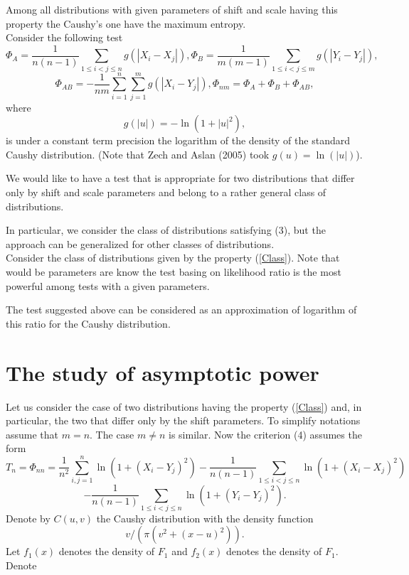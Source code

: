 \documentclass[final,11pt,3p]{elsarticle}
\begin{document}
Among all distributions with given parameters of shift and scale having this property the Caushy's one have the maximum entropy.\\


Consider the following test
\begin{equation}
 \Phi_{A}=\frac{1}{n(n-1)}\sum_{1\leq i<j\leq n} g(|X_i-X_j|),
\Phi_{B}=\frac{1}{m(m-1)}\sum_{1\leq i<j\leq m} g(|Y_i-Y_j|),
\end{equation}
\begin{equation}\label{K1}
\Phi_{AB}=-\frac{1}{nm}\sum_{i=1}^n\sum_{j=1}^m g(|X_i-Y_j|),
\Phi_{nm}=\Phi_{A}+ \Phi_{B}+ \Phi_{AB},
\end{equation}
where
$$
g(|u|)= -\ln (1+|u|^2),
$$
is under a constant term precision the logarithm of the density of the standard Caushy distribution.
(Note that Zech and Aslan (2005) took $g(u)=\ln(|u|)$).



We would like to have a test that is appropriate for two distributions that differ only by shift and scale parameters and belong to a rather general class of distributions.


In particular, we consider the class of distributions satisfying (3), but the approach can be generalized for other classes of distributions.\\
\bigskip
Consider the class of distributions given by the property (\ref{Class}).  Note that would be parameters are know the test basing on likelihood ratio is the most powerful among tests with a given parameters.


The test suggested above can be considered as an approximation of logarithm of this ratio for the Caushy distribution.





\section{The study of asymptotic power}
\label{S:2}

Let us consider the case of two distributions having the property (\ref{Class}) and, in particular, the two that differ only by the shift parameters. To simplify notations assume that $m=n$. The case $m\ne n$ is similar.
Now the criterion  (4)  assumes the form
\begin{equation}
T_n=\Phi_{nn}= \frac{1}{n^2}\sum_{i,j=1}^n \ln(1 + (X_i - Y_j)^2)-\frac{1}{n(n-1)}\sum_{1\leq i<j\leq n}  \ln(1 + (X_i - X_j)^2)
\end{equation}
\begin{equation}
-  \frac{1}{n(n-1)}\sum_{1\leq i<j\leq n}  \ln(1 + (Y_i - Y_j)^2).
\end{equation}
Denote by $C(u,v)$ the Caushy distribution with the density function
$$
v/(\pi(v^2 + (x-u)^2)).
$$Let $f_1(x)$ denotes the density of $F_1$ and $f_2(x)$ denotes the density of $F_1$.
Denote
\end{document}
